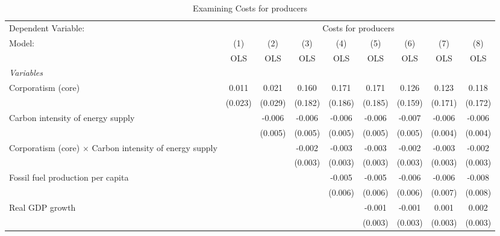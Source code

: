 
\begin{table}[htbp]
   \caption{Examining Costs for producers}
   \centering
   \begin{tabular}{lcccccccc}
      \toprule
      Dependent Variable: & \multicolumn{8}{c}{Costs for producers}\\
      Model:                                                         & (1)     & (2)     & (3)     & (4)     & (5)     & (6)     & (7)     & (8)\\  
                                                                     &  OLS    & OLS     & OLS     & OLS     & OLS     & OLS     & OLS     & OLS\\  
      \midrule
      \emph{Variables}\\
      Corporatism (core)                                             & 0.011   & 0.021   & 0.160   & 0.171   & 0.171   & 0.126   & 0.123   & 0.118\\   
                                                                     & (0.023) & (0.029) & (0.182) & (0.186) & (0.185) & (0.159) & (0.171) & (0.172)\\   
      Carbon intensity of energy supply                              &         & -0.006  & -0.006  & -0.006  & -0.006  & -0.007  & -0.006  & -0.006\\   
                                                                     &         & (0.005) & (0.005) & (0.005) & (0.005) & (0.005) & (0.004) & (0.004)\\   
      Corporatism (core) $\times$ Carbon intensity of energy supply  &         &         & -0.002  & -0.003  & -0.003  & -0.002  & -0.003  & -0.002\\   
                                                                     &         &         & (0.003) & (0.003) & (0.003) & (0.003) & (0.003) & (0.003)\\   
      Fossil fuel production per capita                              &         &         &         & -0.005  & -0.005  & -0.006  & -0.006  & -0.008\\   
                                                                     &         &         &         & (0.006) & (0.006) & (0.006) & (0.007) & (0.008)\\   
      Real GDP growth                                                &         &         &         &         & -0.001  & -0.001  & 0.001   & 0.002\\   
                                                                     &         &         &         &         & (0.003) & (0.003) & (0.003) & (0.003)\\   

\end{tabular}
\end{table}
